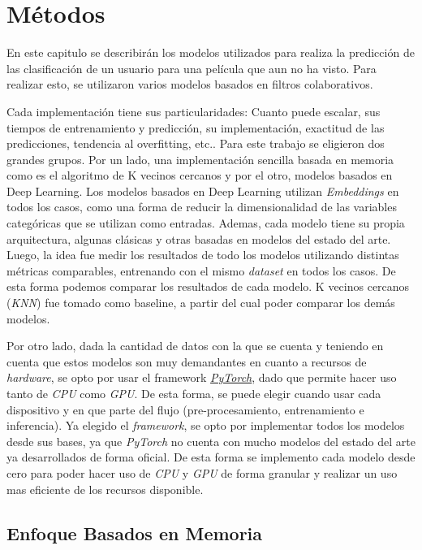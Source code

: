 \documentclass[11pt,a4paper,twoside]{thesis}
\begin{document}
\chapter{Métodos}

En este capitulo se describirán los modelos utilizados para realiza la
predicción de las clasificación de un usuario para una película que aun no ha
visto. Para realizar esto, se utilizaron varios modelos basados en filtros
colaborativos.

Cada implementación tiene sus particularidades: Cuanto puede escalar, sus
tiempos de entrenamiento y predicción, su implementación, exactitud de las
predicciones, tendencia al overfitting, etc.. Para este trabajo se eligieron
dos grandes grupos. Por un lado, una implementación sencilla basada en memoria
como es el algoritmo de K vecinos cercanos y por el otro, modelos basados en
Deep Learning. Los modelos basados en Deep Learning utilizan
\textit{Embeddings} en todos los casos, como una forma de reducir la
dimensionalidad de las variables categóricas que se utilizan como entradas.
Ademas, cada modelo tiene su propia arquitectura, algunas clásicas y otras
basadas en modelos del estado del arte. Luego, la idea fue medir los resultados
de todo los modelos utilizando distintas métricas comparables, entrenando con
el mismo \textit{dataset} en todos los casos. De esta forma podemos comparar
los resultados de cada modelo. K vecinos cercanos (\textit{KNN}) fue tomado
como baseline, a partir del cual poder comparar los demás modelos.

Por otro lado, dada la cantidad de datos con la que se cuenta y teniendo en
cuenta que estos modelos son muy demandantes en cuanto a recursos de
\textit{hardware}, se opto por usar el framework
\href{https://pytorch.org/}{\textit{PyTorch}}, dado que permite hacer uso tanto
de \textit{CPU} como \textit{GPU}. De esta forma, se puede elegir cuando usar
cada dispositivo y en que parte del flujo (pre-procesamiento, entrenamiento e
inferencia). Ya elegido el \textit{framework}, se opto por implementar todos
los modelos desde sus bases, ya que \textit{PyTorch} no cuenta con mucho
modelos del estado del arte ya desarrollados de forma oficial. De esta forma se
implemento cada modelo desde cero para poder hacer uso de \textit{CPU} y
\textit{GPU} de forma granular y realizar un uso mas eficiente de los recursos
disponible.

\section{Enfoque Basados en Memoria}
\end{document}
